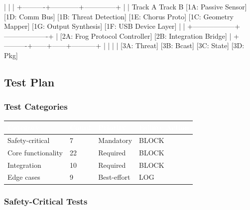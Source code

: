 \documentclass[11pt,letterpaper]{article}
\newcommand{\tableheader}[1]{\textbf{\sffamily\textcolor{white}{#1}}}
\begin{document}
\begin{asciibox}
                         |            |              |
              +----------+------------+--------------+
              |                                      |
         Track A                                Track B
    [1A: Passive Sensor]                   [1D: Comm Bus]
    [1B: Threat Detection]                 [1E: Chorus Proto]
    [1C: Geometry Mapper]                  [1G: Output Synthesis]
    [1F: USB Device Layer]
              |                                      |
              +------------------+-------------------+
                                 |
                    [2A: Frog Protocol Controller]
                    [2B: Integration Bridge]
                                 |
              +----------+------+------+-----------+
              |          |             |            |
         [3A: Threat] [3B: Bcast]  [3C: State]  [3D: Pkg]
\end{asciibox}

\subsection{Test Plan}

\subsubsection{Test Categories}

\begin{center}
\begin{tabularx}{\textwidth}{L{3cm}C{1.5cm}C{2cm}C{2cm}}
\toprule
{}
\tableheader{Category} & \tableheader{Count} & \tableheader{Priority} & \tableheader{Failure Action} \\
\midrule
Safety-critical & 7 & Mandatory & BLOCK \\
Core functionality & 22 & Required & BLOCK \\
Integration & 10 & Required & BLOCK \\
Edge cases & 9 & Best-effort & LOG \\
\bottomrule
\end{tabularx}
\end{center}

\subsubsection{Safety-Critical Tests}
\end{document}
